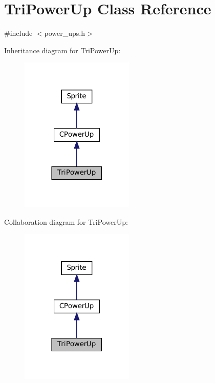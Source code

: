 \hypertarget{classTriPowerUp}{}\section{Tri\+Power\+Up Class Reference}
\label{classTriPowerUp}


{\ttfamily \#include $<$power\+\_\+ups.\+h$>$}



Inheritance diagram for Tri\+Power\+Up\+:\nopagebreak
\begin{figure}[H]
\begin{center}
\leavevmode
\includegraphics[width=153pt]{classTriPowerUp__inherit__graph}
\end{center}
\end{figure}


Collaboration diagram for Tri\+Power\+Up\+:\nopagebreak
\begin{figure}[H]
\begin{center}
\leavevmode
\includegraphics[width=153pt]{classTriPowerUp__coll__graph}
\end{center}
\end{figure}
